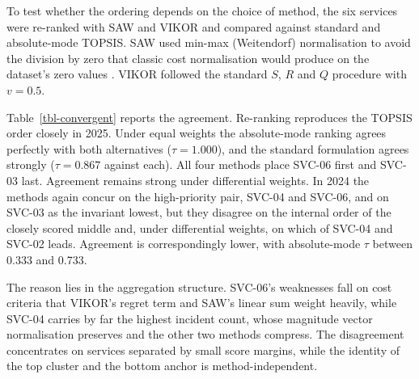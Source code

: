\documentclass[
  journal,
]{IEEEtran}%
\begin{document}
To test whether the ordering depends on the choice of method, the six
services were re-ranked with SAW and VIKOR and compared against standard
and absolute-mode TOPSIS. SAW used min-max (Weitendorf) normalisation to
avoid the division by zero that classic cost normalisation would produce
on the dataset's zero values
. VIKOR
followed the standard \(S\), \(R\) and \(Q\) procedure with \(v = 0.5\).

Table~\ref{tbl-convergent} reports the agreement. Re-ranking reproduces
the TOPSIS order closely in 2025. Under equal weights the absolute-mode
ranking agrees perfectly with both alternatives (\(\tau = 1.000\)), and
the standard formulation agrees strongly (\(\tau = 0.867\) against
each). All four methods place SVC-06 first and SVC-03 last. Agreement
remains strong under differential weights. In 2024 the methods again
concur on the high-priority pair, SVC-04 and SVC-06, and on SVC-03 as
the invariant lowest, but they disagree on the internal order of the
closely scored middle and, under differential weights, on which of
SVC-04 and SVC-02 leads. Agreement is correspondingly lower, with
absolute-mode \(\tau\) between 0.333 and 0.733.

\begin{table}

\caption{\label{tbl-convergent}Kendall's \(\tau\) between each TOPSIS
formulation and the alternative methods}


\end{table}%

The reason lies in the aggregation structure. SVC-06's weaknesses fall
on cost criteria that VIKOR's regret term and SAW's linear sum weight
heavily, while SVC-04 carries by far the highest incident count, whose
magnitude vector normalisation preserves and the other two methods
compress. The disagreement concentrates on services separated by small
score margins, while the identity of the top cluster and the bottom
anchor is method-independent.
\end{document}
